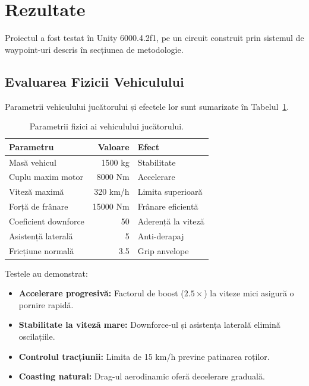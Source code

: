 \documentclass[11pt,twocolumn]{article}
\begin{document}
\section{Rezultate}
\label{sec:results}

Proiectul a fost testat în Unity 6000.4.2f1, pe un circuit construit prin sistemul de waypoint-uri descris în secțiunea de metodologie.

\subsection{Evaluarea Fizicii Vehiculului}

Parametrii vehiculului jucătorului și efectele lor sunt sumarizate în Tabelul~\ref{tab:vehicle_params}.

\begin{table}[h]
\centering
\small
\begin{tabular}{lrl}
\toprule
\textbf{Parametru} & \textbf{Valoare} & \textbf{Efect} \\
\midrule
Masă vehicul & 1500 kg & Stabilitate \\
Cuplu maxim motor & 8000 Nm & Accelerare \\
Viteză maximă & 320 km/h & Limita superioară \\
Forță de frânare & 15000 Nm & Frânare eficientă \\
Coeficient downforce & 50 & Aderență la viteză \\
Asistență laterală & 5 & Anti-derapaj \\
Fricțiune normală & 3.5 & Grip anvelope \\
\bottomrule
\end{tabular}
\caption{Parametrii fizici ai vehiculului jucătorului.}
\label{tab:vehicle_params}
\end{table}

Testele au demonstrat:
\begin{itemize}
    \item \textbf{Accelerare progresivă:} Factorul de boost ($2.5\times$) la viteze mici asigură o pornire rapidă.
    \item \textbf{Stabilitate la viteză mare:} Downforce-ul și asistența laterală elimină oscilațiile.
    \item \textbf{Controlul tracțiunii:} Limita de 15 km/h previne patinarea roților.
    \item \textbf{Coasting natural:} Drag-ul aerodinamic oferă decelerare graduală.
\end{itemize}
\end{document}
